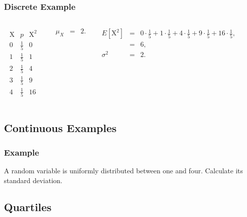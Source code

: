 \begin{frame}
  \frametitle{Discrete Example}


   \begin{columns}
     \begin{eqnarray*}
       \begin{array}{r|l|l}
         \mathrm{X} & p & \mathrm{X}^2\\ \hline
          0 & \frac{1}{5} & 0 \\ [5pt]
          1 & \frac{1}{5} & 1 \\ [5pt]
          2 & \frac{1}{5} & 4 \\ [5pt]
          3 & \frac{1}{5} & 9 \\ [5pt]
          4 & \frac{1}{5} & 16
       \end{array}
     \end{eqnarray*}

       \begin{eqnarray*}
         \mu_X & = & 2.
      \end{eqnarray*}

     {
       \begin{eqnarray*}
         E\left[\mathrm{X}^2\right] & = & 0 \cdot \frac{1}{5} + 1 \cdot \frac{1}{5} + 4 \cdot \frac{1}{5} + 9 \cdot \frac{1}{5} + 16 \cdot \frac{1}{5}, \\
         & = & 6, \\
         \sigma^2 & = & 2.
       \end{eqnarray*}
     }

   \end{columns}

  
\end{frame}



\subsection{Continuous Examples}

\begin{frame}
  \frametitle{Example}

  A random variable is uniformly distributed between one and
  four. Calculate its standard deviation.
  
\end{frame}


\subsection{Quartiles}

